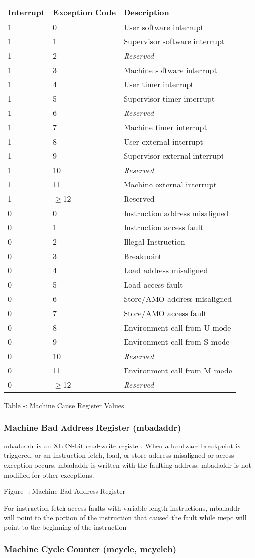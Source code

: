 \begin{longtable}[]{@{}lll@{}}
\toprule
Interrupt & Exception Code & Description\tabularnewline
\midrule
\endhead
1 & 0 & User software interrupt\tabularnewline
1 & 1 & Supervisor software interrupt\tabularnewline
1 & 2 & \emph{Reserved}\tabularnewline
1 & 3 & Machine software interrupt\tabularnewline
1 & 4 & User timer interrupt\tabularnewline
1 & 5 & Supervisor timer interrupt\tabularnewline
1 & 6 & \emph{Reserved}\tabularnewline
1 & 7 & Machine timer interrupt\tabularnewline
1 & 8 & User external interrupt\tabularnewline
1 & 9 & Supervisor external interrupt\tabularnewline
1 & 10 & \emph{Reserved}\tabularnewline
1 & 11 & Machine external interrupt\tabularnewline
1 & $\geqslant$12 & Reserved\tabularnewline
0 & 0 & Instruction address misaligned\tabularnewline
0 & 1 & Instruction access fault\tabularnewline
0 & 2 & Illegal Instruction\tabularnewline
0 & 3 & Breakpoint\tabularnewline
0 & 4 & Load address misaligned\tabularnewline
0 & 5 & Load access fault\tabularnewline
0 & 6 & Store/AMO address misaligned\tabularnewline
0 & 7 & Store/AMO access fault\tabularnewline
0 & 8 & Environment call from U-mode\tabularnewline
0 & 9 & Environment call from S-mode\tabularnewline
0 & 10 & \emph{Reserved}\tabularnewline
0 & 11 & Environment call from M-mode\tabularnewline
0 & $\geqslant$12 & \emph{Reserved}\tabularnewline
\bottomrule
\end{longtable}

\protect\hypertarget{_Ref326948235}{}{}Table ‑: Machine Cause Register
Values

\subsubsection{Machine Bad Address Register
(mbadaddr)}\label{machine-bad-address-register-mbadaddr}

mbadaddr is an XLEN-bit read-write register. When a hardware breakpoint
is triggered, or an instruction-fetch, load, or store address-misaligned
or access exception occurs, mbadaddr is written with the faulting
address. mbadaddr is not modified for other exceptions.

\missingfigure{}

Figure ‑: Machine Bad Address Register

For instruction-fetch access faults with variable-length instructions,
mbadaddr will point to the portion of the instruction that caused the
fault while mepc will point to the beginning of the instruction.

\subsubsection{Machine Cycle Counter (mcycle,
mcycleh)}\label{machine-cycle-counter-mcycle-mcycleh}

